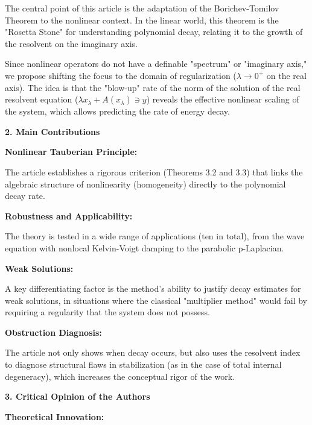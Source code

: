 \documentclass[11pt,reqno]{amsart}
\theoremstyle{remark}
\begin{document}
The central point of this article is the adaptation of the Borichev-Tomilov Theorem to the nonlinear context. In the linear world, this theorem is the "Rosetta Stone" for understanding polynomial decay, relating it to the growth of the resolvent on the imaginary axis.

Since nonlinear operators do not have a definable "spectrum" or "imaginary axis," we propose shifting the focus to the domain of regularization ($\lambda \to 0^+$ on the real axis). The idea is that the "blow-up" rate of the norm of the solution of the real resolvent equation ($\lambda x_\lambda + A(x_\lambda) \ni y$) reveals the effective nonlinear scaling of the system, which allows predicting the rate of energy decay.

\medskip
{\bf 2. Main Contributions}

\medskip
{\bf Nonlinear Tauberian Principle:}

\medskip
The article establishes a rigorous criterion (Theorems 3.2 and 3.3) that links the algebraic structure of nonlinearity (homogeneity) directly to the polynomial decay rate.

\medskip
{\bf Robustness and Applicability:}

\medskip

The theory is tested in a wide range of applications (ten in total), from the wave equation with nonlocal Kelvin-Voigt damping to the parabolic p-Laplacian.

\medskip
{\bf Weak Solutions:}

\medskip

A key differentiating factor is the method's ability to justify decay estimates for weak solutions, in situations where the classical "multiplier method" would fail by requiring a regularity that the system does not possess.

\medskip

{\bf Obstruction Diagnosis:}

\medskip

The article not only shows when decay occurs, but also uses the resolvent index to diagnose structural flaws in stabilization (as in the case of total internal degeneracy), which increases the conceptual rigor of the work.

\medskip

{\bf 3. Critical Opinion of the Authors}

\medskip

{\bf Theoretical Innovation:}

\medskip
\end{document}
